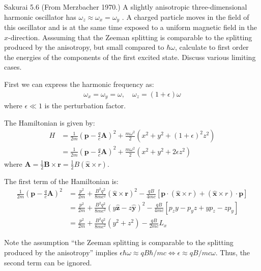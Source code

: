 \documentclass{article}
\newcommand{\bs}{\boldsymbol}
\begin{document}
	\newpage
	\begin{section}{Sakurai 5.6}
		(From Merzbacher 1970.) A slightly anisotropic three-dimensional harmonic oscillator has $\omega_z \approx \omega_x = \omega_y$ . A charged particle moves in the field of this oscillator and is at the same time exposed to a uniform magnetic field in the $x$-direction. Asssuming that the Zeeman splitting is comparable to the splitting produced by the anisotropy, but small compared to $\hbar \omega$, calculate to first order the energies of the components of the first excited state. Discuss various limiting cases.

		\begin{tcolorbox}[breakable]
        First we can express the harmonic frequency as:
				\begin{align*}
					\omega_x = \omega_y = \omega, \quad \omega_z = (1+\epsilon) \omega
				\end{align*}
        where $\epsilon \ll 1$ is the perturbation factor.

        The Hamiltonian is given by:
        \begin{align*}
          H &= \frac{1}{2m} \left(\bs{p} - \frac{q}{c} \bs{A}\right)^2 + \frac{m \omega^2}{2} \left( x^2 + y^2 + (1+\epsilon)^2 z^2 \right) \\
            &= \frac{1}{2m} \left(\bs{p} - \frac{q}{c} \bs{A}\right)^2 + \frac{m\omega^2}{2} \left(x^2 + y^2 + 2\epsilon z^2 \right) 
        \end{align*}
        where $\bs{A} = \frac{1}{2} \bs{B}\times\bs{r} = \frac{1}{2} B (\bs{\hat{x}}\times{r})$. 
        
        The first term of the Hamiltonian is:
        \begin{align*}
          \frac{1}{2m} \left(\bs{p} - \frac{q}{c} \bs{A}\right)^2 
          &= \frac{p^2}{2m} + \frac{B^2q^2}{8mc^2} \left(\bs{\hat{x}} \times \bs{r}\right)^2 - \frac{qB}{4mc} \left[\bs{p} \cdot (\bs{\hat{x}} \times r) + (\bs{\hat{x}} \times r) \cdot \bs{p} \right] \\
          &= \frac{p^2}{2m} + \frac{B^2q^2}{8mc^2} \left(y \bs{\hat{z}} - z \bs{\hat{y}}\right)^2 - \frac{qB}{4mc} \left[p_z y - p_y z + y p_z - z p_y\right] \\
          &= \frac{p^2}{2m} + \frac{B^2q^2}{8mc^2} \left(y^2+z^2\right) - \frac{qB}{2mc} L_x 
        \end{align*}
		
		Note the assumption ``the Zeeman splitting is comparable to the splitting produced by the anisotropy'' implies $\epsilon \hbar \omega \approx qB\hbar/mc \iff \epsilon \approx qB/mc\omega$. Thus, the second term can be ignored.


\end{tcolorbox}
\end{section}
\end{document}
